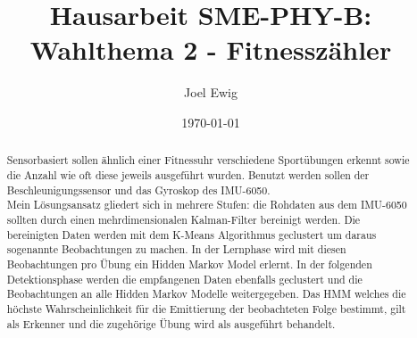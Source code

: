 \documentclass{article}
\begin{document}
\title{Hausarbeit SME-PHY-B: Wahlthema 2 - Fitnesszähler}
\author{Joel Ewig}
\date{\today}
\maketitle
\clearpage

\begin{abstract}
Sensorbasiert sollen ähnlich einer Fitnessuhr verschiedene Sportübungen erkennt sowie die Anzahl wie oft diese jeweils ausgeführt wurden.
Benutzt werden sollen der Beschleunigungssensor und das Gyroskop des IMU-6050.\\
Mein Lösungsansatz gliedert sich in mehrere Stufen:
die Rohdaten aus dem IMU-6050 sollten durch einen mehrdimensionalen Kalman-Filter bereinigt werden.
Die bereinigten Daten werden mit dem K-Means Algorithmus geclustert um daraus sogenannte \glqq{}Beobachtungen\grqq{} zu machen.
In der Lernphase wird mit diesen Beobachtungen pro Übung ein Hidden Markov Model erlernt.
In der folgenden Detektionsphase werden die empfangenen Daten ebenfalls geclustert und die Beobachtungen an alle Hidden Markov Modelle weitergegeben.
Das HMM welches die höchste Wahrscheinlichkeit für die Emittierung der beobachteten Folge bestimmt, gilt als Erkenner und die zugehörige Übung wird als ausgeführt behandelt.
\end{abstract}
\clearpage

\tableofcontents
\clearpage
\end{document}
